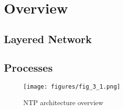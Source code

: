\chapter{Overview}

\section{Layered Network}
\label{sec:Layered_network}

\section{Processes}
\label{sec:processes}

\begin{figure}[htpb]
    \centering
    \texttt{[image: figures/fig\_3\_1.png]}
    \caption{NTP architecture overview}
    \label{fig:arch_overview}
\end{figure}
